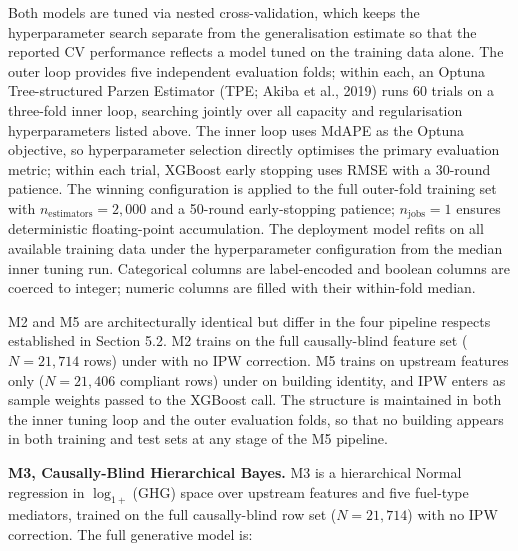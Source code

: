 Both models are tuned via nested cross-validation, which keeps the hyperparameter search separate from the generalisation estimate so that the reported CV performance reflects a model tuned on the training data alone. The outer loop provides five independent evaluation folds; within each, an Optuna Tree-structured Parzen Estimator (TPE; Akiba et al., 2019) runs 60 trials on a three-fold inner loop, searching jointly over all capacity and regularisation hyperparameters listed above. The inner loop uses MdAPE as the Optuna objective, so hyperparameter selection directly optimises the primary evaluation metric; within each trial, XGBoost early stopping uses RMSE with a 30-round patience. The winning configuration is applied to the full outer-fold training set with $n_{\text{estimators}} = 2{,}000$ and a 50-round early-stopping patience; $n_{\text{jobs}} = 1$ ensures deterministic floating-point accumulation. The deployment model refits on all available training data under the hyperparameter configuration from the median inner tuning run. Categorical columns are label-encoded and boolean columns are coerced to integer; numeric columns are filled with their within-fold median.

M2 and M5 are architecturally identical but differ in the four pipeline respects established in Section 5.2. M2 trains on the full causally-blind feature set ($N = 21{,}714$ rows) under  with no IPW correction. M5 trains on upstream features only ($N = 21{,}406$ compliant rows) under  on building identity, and IPW enters as sample weights passed to the XGBoost  call. The  structure is maintained in both the inner tuning loop and the outer evaluation folds, so that no building appears in both training and test sets at any stage of the M5 pipeline.

\textbf{M3, Causally-Blind Hierarchical Bayes.} M3 is a hierarchical Normal regression in $\log_{1+}$(GHG) space over upstream features and five fuel-type mediators, trained on the full causally-blind row set ($N = 21{,}714$) with no IPW correction. The full generative model is:

